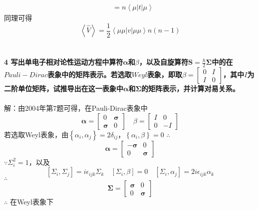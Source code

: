 \documentclass[12pt]{article}
\numberwithin{equation}{section}	 %
\begin{document}
\begin{spacing}{1.5}
\begin{align*}
&= n\left<\mu\left|t\right|\mu\right>
\end{align*}
同理可得
\begin{equation}
\left<\hat{V}\right> = \frac{1}{2}\left<\mu\mu\left|v\right|\mu\mu\right>n(n-1)
\end{equation}
~\\
~\\
\textbf{4 \quad 写出单电子相对论性运动方程中算符$\bm\alpha$和$\beta$，以及自旋算符$\displaystyle \bm{S}=\frac{\hbar}{2}\bm\Sigma$中的在$Pauli-Dirac$表象中的矩阵表示。若选取$Weyl$表象，即取$\displaystyle \beta=\begin{bmatrix} 0 & I \\ I & 0 \end{bmatrix}$，其中$I$为二阶单位矩阵，试推导出在这一表象中$\bm\alpha$和$\bm\Sigma$的矩阵表示，并计算对易关系。}\\
~\\
解：由2004年第7题可得，在Pauli-Dirac表象中
\begin{equation}
\bm\alpha = \begin{bmatrix} 0 & \bm\sigma \\ \bm\sigma & 0 \end{bmatrix} \quad \beta = \begin{bmatrix} I & 0 \\ 0 & -I \end{bmatrix} 
\end{equation}
若选取Weyl表象，由$\displaystyle \left\{\alpha_{i},\alpha_{j}\right\}=2\delta_{ij}$，$\displaystyle \left\{\alpha_{i},\beta\right\}=0$
$\therefore$
\begin{equation}
\bm\alpha = \begin{bmatrix} -\bm\sigma & 0 \\ 0 & \bm\sigma \end{bmatrix}
\end{equation}
$\because \Sigma_{i}^{2}=1$，以及
\begin{equation}
\left[\Sigma_{i},\Sigma_{j}\right]=i\epsilon_{ijk}\Sigma_{k} \quad \left[\Sigma_{i},\beta\right]=0 \quad \left[\Sigma_{i},\alpha_{j}\right]=2i\epsilon_{ijk}\alpha_{k}
\end{equation}
$\therefore$
\begin{equation}
\bm\Sigma = \begin{bmatrix} \bm\sigma & 0 \\ 0 & \bm\sigma \end{bmatrix}
\end{equation}
$\therefore$ 在Weyl表象下
\begin{equation}

\end{equation}
\end{spacing}
\end{document}
